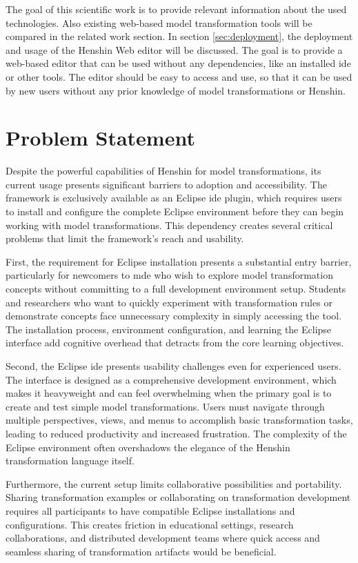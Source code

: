 The goal of this scientific work is to provide relevant information about the used technologies. Also existing web-based model transformation tools will be compared in the related work section. In section \ref{sec:deployment}, the deployment and usage of the Henshin Web editor will be discussed. The goal is to provide a web-based editor that can be used without any dependencies, like an installed \acs{ide} or other tools. The editor should be easy to access and use, so that it can be used by new users without any prior knowledge of model transformations or Henshin.

\section{Problem Statement}
\label{subsec:problem-statement}

Despite the powerful capabilities of Henshin for model transformations, its current usage presents significant barriers to adoption and accessibility. The framework is exclusively available as an Eclipse \ac{ide} plugin, which requires users to install and configure the complete Eclipse environment before they can begin working with model transformations. This dependency creates several critical problems that limit the framework's reach and usability.

First, the requirement for Eclipse installation presents a substantial entry barrier, particularly for newcomers to \ac{mde} who wish to explore model transformation concepts without committing to a full development environment setup. Students and researchers who want to quickly experiment with transformation rules or demonstrate concepts face unnecessary complexity in simply accessing the tool. The installation process, environment configuration, and learning the Eclipse interface add cognitive overhead that detracts from the core learning objectives.

Second, the Eclipse \ac{ide} presents usability challenges even for experienced users. The interface is designed as a comprehensive development environment, which makes it heavyweight and can feel overwhelming when the primary goal is to create and test simple model transformations. Users must navigate through multiple perspectives, views, and menus to accomplish basic transformation tasks, leading to reduced productivity and increased frustration. The complexity of the Eclipse environment often overshadows the elegance of the Henshin transformation language itself.

Furthermore, the current setup limits collaborative possibilities and portability. Sharing transformation examples or collaborating on transformation development requires all participants to have compatible Eclipse installations and configurations. This creates friction in educational settings, research collaborations, and distributed development teams where quick access and seamless sharing of transformation artifacts would be beneficial.

